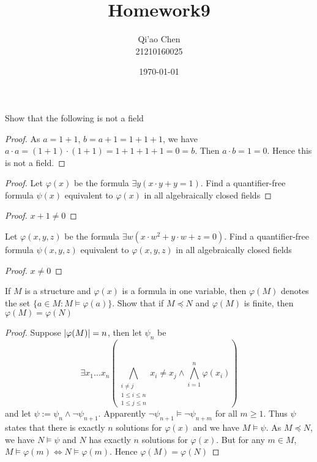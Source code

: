 \documentclass[11pt]{article}
\author{Qi'ao Chen\\21210160025}
\date{\today}
\title{Homework9}
\begin{document}
\maketitle
\begin{exercise}
Show that the following is not a field
\end{exercise}

\begin{proof}
As \(a=1+1\), \(b=a+1=1+1+1\), we have \(a\cdot a=(1+1)\cdot(1+1)=1+1+1+1=0=b\). Then \(a\cdot b=1=0\). Hence
this is not a field.
\end{proof}

\begin{proof}
Let \(\varphi(x)\) be the formula \(\exists y(x\cdot y+y=1)\). Find a quantifier-free formula \(\psi(x)\) equivalent
to \(\varphi(x)\) in all algebraically closed fields
\end{proof}

\begin{proof}
\(x+1\neq 0\)
\end{proof}

\begin{exercise}
Let \(\varphi(x,y,z)\) be the formula \(\exists w(x\cdot w^2+y\cdot w+z=0)\). Find a quantifier-free formula \(\psi(x,y,z)\)
equivalent to \(\varphi(x,y,z)\) in all algebraically closed fields
\end{exercise}

\begin{proof}
\(x\neq 0\)
\end{proof}

\begin{exercise}
If \(M\) is a structure and \(\varphi(x)\) is a formula in one variable, then \(\varphi(M)\) denotes the
set \(\{a\in M:M\vDash\varphi(a)\}\). Show that if \(M\preceq N\) and \(\varphi(M)\) is finite, then \(\varphi(M)=\varphi(N)\)
\end{exercise}

\begin{proof}
Suppose \(\abs{\varphi(M)}=n\), then let \(\psi_n\) be
\begin{equation*}
\exists x_1\dots x_n(\bigwedge_{\substack{i\neq j\\1\le i\le n\\ 1\le j\le n}}x_i\neq x_j\wedge\bigwedge_{i=1}^n\varphi(x_i))
\end{equation*}
and let \(\psi:=\psi_n\wedge\neg\psi_{n+1}\). Apparently \(\neg\psi_{n+1}\vDash\neg\psi_{n+m}\) for all \(m\ge 1\). Thus \(\psi\) states
that there is exactly \(n\) solutions for \(\varphi(x)\) and we have \(M\vDash\psi\). As \(M\preceq N\), we have \(N\vDash\psi\)
and \(N\) has exactly \(n\) solutions for \(\varphi(x)\). But for any \(m\in M\), \(M\vDash\varphi(m)\Leftrightarrow N\vDash\varphi(m)\). Hence \(\varphi(M)=\varphi(N)\)
\end{proof}
\end{document}
